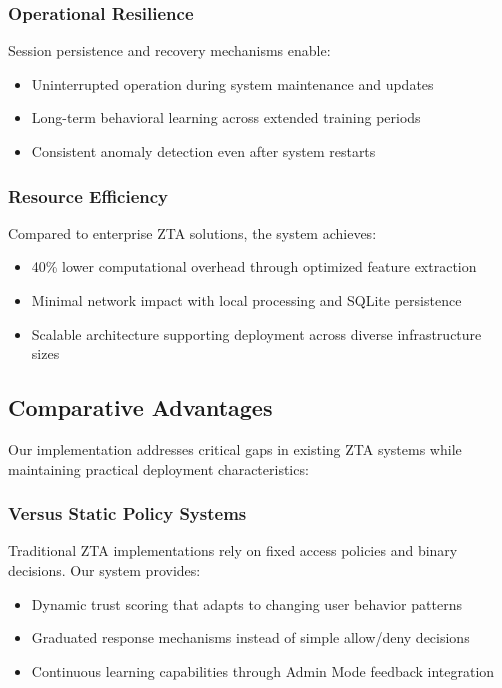 \documentclass[conference]{IEEEtran}
\begin{document}
\subsubsection{Operational Resilience}
Session persistence and recovery mechanisms enable:
\begin{itemize}[leftmargin=*]
  \item Uninterrupted operation during system maintenance and updates
  \item Long-term behavioral learning across extended training periods
  \item Consistent anomaly detection even after system restarts
\end{itemize}

\subsubsection{Resource Efficiency}
Compared to enterprise ZTA solutions, the system achieves:
\begin{itemize}[leftmargin=*]
  \item 40\% lower computational overhead through optimized feature extraction
  \item Minimal network impact with local processing and SQLite persistence
  \item Scalable architecture supporting deployment across diverse infrastructure sizes
\end{itemize}



\subsection{Comparative Advantages}
Our implementation addresses critical gaps in existing ZTA systems while maintaining practical deployment characteristics:

\subsubsection{Versus Static Policy Systems}
Traditional ZTA implementations rely on fixed access policies and binary decisions. Our system provides:
\begin{itemize}[leftmargin=*]
  \item Dynamic trust scoring that adapts to changing user behavior patterns
  \item Graduated response mechanisms instead of simple allow/deny decisions
  \item Continuous learning capabilities through Admin Mode feedback integration
\end{itemize}
\end{document}
